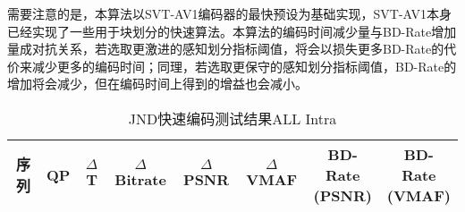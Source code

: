   需要注意的是，本算法以SVT-AV1编码器的最快预设为基础实现，SVT-AV1本身已经实现了一些用于块划分的快速算法。本算法的编码时间减少量与BD-Rate增加量成对抗关系，若选取更激进的感知划分指标阈值，将会以损失更多BD-Rate的代价来减少更多的编码时间；同理，若选取更保守的感知划分指标阈值，BD-Rate的增加将会减少，但在编码时间上得到的增益也会减小。


  \begin{table}[!hpt]
    \renewcommand{\arraystretch}{0.9}
    \caption{JND快速编码测试结果ALL Intra}
    \label{tab:av1-jnd-part-AI}
    \centering
    \begin{tabular}{|c|c|c|c|c|c|c|c|} \hline
      序列    & QP & $\Delta$T &  $\Delta$Bitrate & $\Delta$PSNR & $\Delta$VMAF & \makecell{BD-Rate\\(PSNR)} & \makecell{BD-Rate\\(VMAF)}\\ \hline


\end{tabular}
\end{table}
